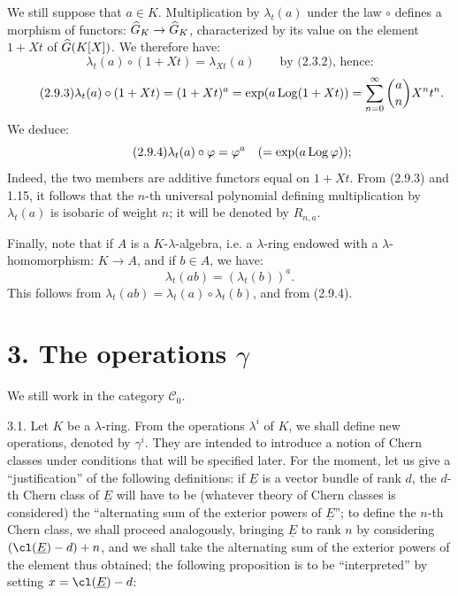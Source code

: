 %
We still suppose that \(a\in K\). Multiplication by \(\lambda_t(a)\) under the law \(\circ\) defines a morphism of functors: \(\widehat G_K\to\widehat G_K\), characterized by its value on the element \(1+Xt\) of \(\widehat G(K[X])\). We therefore have:
\[
  \lambda_t(a)\circ(1+Xt)=\lambda_{Xt}(a)\qquad\text{by (2.3.2), hence:}
\]
\begin{equation}\tag{2.9.3}
  \lambda_t(a)\circ(1+Xt)
  =(1+Xt)^a
  =\exp(a\operatorname{Log}(1+Xt))
  =\sum_{n=0}^{\infty}\binom{a}{n}X^nt^n .
\end{equation}
We deduce:
\begin{equation}\tag{2.9.4}
  \lambda_t(a)\circ\varphi=\varphi^a
  \quad(=\exp(a\operatorname{Log}\varphi)) ;
\end{equation}
Indeed, the two members are additive functors equal on \(1+Xt\). From (2.9.3) and 1.15, it follows that the \(n\)-th universal polynomial defining multiplication by \(\lambda_t(a)\) is isobaric of weight \(n\); it will be denoted by \(R_{n,a}\).

Finally, note that if \(A\) is a \(K\)-\(\lambda\)-algebra, i.e. a \(\lambda\)-ring endowed with a \(\lambda\)-homomorphism: \(K\to A\), and if \(b\in A\), we have:
\begin{equation}\tag{2.9.5}
  \lambda_t(ab)=(\lambda_t(b))^a .
\end{equation}
This follows from \(\lambda_t(ab)=\lambda_t(a)\circ\lambda_t(b)\), and from (2.9.4).

\section*{3. The operations \(\gamma\)}

We still work in the category \(\mathcal C_0\).

3.1. Let \(K\) be a \(\lambda\)-ring. From the operations \(\lambda^i\) of \(K\), we shall define new operations, denoted by \(\gamma^i\). They are intended to introduce a notion of Chern classes under conditions that will be specified later. For the moment, let us give a ``justification'' of the following definitions: if \(\underline{E}\) is a vector bundle of rank \(d\), the \(d\)-th Chern class of \(\underline{E}\) will have to be (whatever theory of Chern classes is considered) the ``alternating sum of the exterior powers
%
of \(\underline{E}\)'';
to define the \(n\)-th Chern class, we shall proceed analogously, bringing \(\underline{E}\) to rank \(n\) by considering \((\cl(\underline{E})-d)+n\), and we shall take the alternating sum of the exterior powers of the element thus obtained; the following proposition is to be ``interpreted'' by setting \(x=\cl(\underline{E})-d\):

